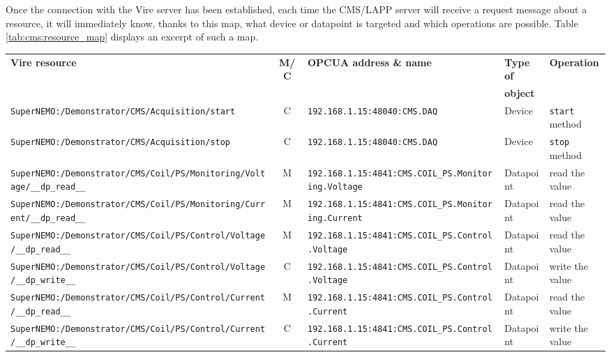 Once the  connection with the  Vire server has been  established, each
time the CMS/LAPP  server will receive a request message  about a resource,
it will immediately know, thanks to this map, what device or datapoint
is targeted and which operations are possible.
Table \ref{tab:cms:resource_map}  displays an excerpt of
such a map.

\begin{sidewaystable}[p]
\begin{center}%
\footnotesize
\begin{tabular}{|l|c|l|l|l|}
\hline
\textbf{Vire resource}  &  \textbf{M/C} & \textbf{OPCUA address \& name} & \textbf{Type of} & \textbf{Operation} \\
 &   & \ & \textbf{ object} &  \\
\hline
\hline
\verb|SuperNEMO:/Demonstrator/CMS/Acquisition/start| & C &
\texttt{192.168.1.15:48040:CMS.DAQ} & Device & \texttt{start} method \\
\hline
\verb|SuperNEMO:/Demonstrator/CMS/Acquisition/stop| & C &
\texttt{192.168.1.15:48040:CMS.DAQ} & Device & \texttt{stop} method \\
\hline
\verb|SuperNEMO:/Demonstrator/CMS/Coil/PS/Monitoring/Voltage/__dp_read__| & M &
\texttt{192.168.1.15:4841:CMS.COIL\_PS.Monitoring.Voltage} & Datapoint & read the value \\
\hline
\verb|SuperNEMO:/Demonstrator/CMS/Coil/PS/Monitoring/Current/__dp_read__| &M &
\texttt{192.168.1.15:4841:CMS.COIL\_PS.Monitoring.Current} & Datapoint & read the value \\
\hline
\verb|SuperNEMO:/Demonstrator/CMS/Coil/PS/Control/Voltage/__dp_read__| &M &
\texttt{192.168.1.15:4841:CMS.COIL\_PS.Control.Voltage} & Datapoint & read the value \\
\hline
\verb|SuperNEMO:/Demonstrator/CMS/Coil/PS/Control/Voltage/__dp_write__| & C &
\texttt{192.168.1.15:4841:CMS.COIL\_PS.Control.Voltage} & Datapoint & write the value \\
\hline
\verb|SuperNEMO:/Demonstrator/CMS/Coil/PS/Control/Current/__dp_read__| &M &
\texttt{192.168.1.15:4841:CMS.COIL\_PS.Control.Current} & Datapoint & read the value \\
\hline
\verb|SuperNEMO:/Demonstrator/CMS/Coil/PS/Control/Current/__dp_write__| & C &
\texttt{192.168.1.15:4841:CMS.COIL\_PS.Control.Current} & Datapoint & write the value \\
\hline
\end{tabular}
\normalsize
\end{center}
\caption{Example of a map of resources with their correspondances with OPCUA datapoints read/write access
and devices methods.}
\label{tab:cms:resource_map}
\end{sidewaystable}
